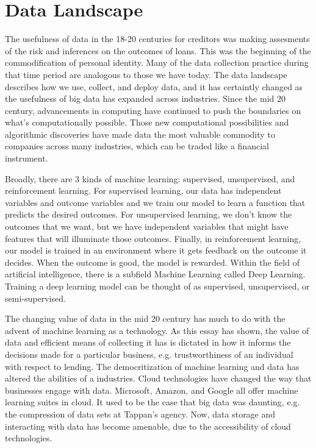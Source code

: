 \section{Data Landscape}
The usefulness of data in the 18-20 centuries for creditors was making
assesments of the risk and inferences on the outcomes of loans. This was the
beginning of the commodification of personal identity. Many of the data
collection practice during that time period are analogous to those we have today.
The data landscape describes how we use, collect, and deploy data, and it has
certaintly changed as the usefulness of
big data %
has expanded across
industries. Since the mid 20 century, advancements in computing have
continued to push the boundaries on what's computationally possible. Those new
computational possibilities and algorithmic discoveries have made data the most
valuable commodity to companies across many industries, which can be traded
like a financial instrument.

Broadly, there are 3 kinds of machine learning: supervised, unsupervised, and
reinforcement learning. For supervised learning, our data has independent
variables and outcome variables and we train our model to learn a function that
predicts the desired outcomes. For unsupervised learning, we don't know the
outcomes that we want, but we have independent variables that might have
features that will illuminate those outcomes. Finally, in reinforcement
learning, our model is trained in an environment where it gets feedback on the
outcome it decides. When the outcome is good, the model is rewarded.
Within the field of artificial intelligence, there is a subfield Machine Learning called Deep Learning.
Training a deep learning model can be thought of as supervised, unsupervised, or
semi-supervised.

The changing value of data in the mid 20 century has much to do with the
advent of machine learning as a technology. As this essay has shown, the value
of data and efficient means of collecting it has is dictated in how it informs
the decisions made for a particular business, e.g. trustworthiness of an
individual with respect to lending. The democritization of machine learning and
data has altered the abilities of a industries. Cloud technologies have changed
the way that businesses engage with data. Microsoft, Amazon, and Google all
offer machine learning suites in cloud. It used to be the case that big data
was daunting, e.g. the compression of data sets at Tappan's agency.
Now, data storage and interacting with data has become amenable,
due to the accessibility of cloud technologies.

